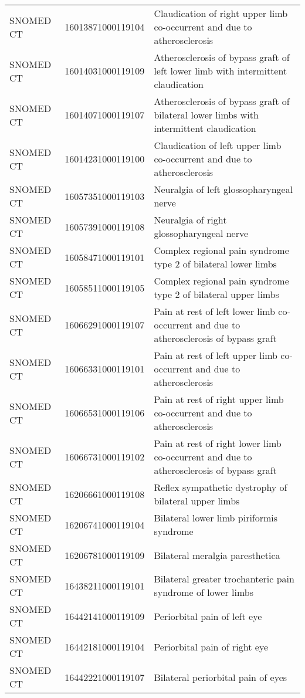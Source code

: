 \begin{longtable}{p{}p{}p{}}
  SNOMED CT & 16013871000119104 & Claudication of right upper limb co-occurrent and due to atherosclerosis \\ 
  SNOMED CT & 16014031000119109 & Atherosclerosis of bypass graft of left lower limb with intermittent claudication \\ 
  SNOMED CT & 16014071000119107 & Atherosclerosis of bypass graft of bilateral lower limbs with intermittent claudication \\ 
  SNOMED CT & 16014231000119100 & Claudication of left upper limb co-occurrent and due to atherosclerosis \\ 
  SNOMED CT & 16057351000119103 & Neuralgia of left glossopharyngeal nerve \\ 
  SNOMED CT & 16057391000119108 & Neuralgia of right glossopharyngeal nerve \\ 
  SNOMED CT & 16058471000119101 & Complex regional pain syndrome type 2 of bilateral lower limbs \\ 
  SNOMED CT & 16058511000119105 & Complex regional pain syndrome type 2 of bilateral upper limbs \\ 
  SNOMED CT & 16066291000119107 & Pain at rest of left lower limb co-occurrent and due to atherosclerosis of bypass graft \\ 
  SNOMED CT & 16066331000119101 & Pain at rest of left upper limb co-occurrent and due to atherosclerosis \\ 
  SNOMED CT & 16066531000119106 & Pain at rest of right upper limb co-occurrent and due to atherosclerosis \\ 
  SNOMED CT & 16066731000119102 & Pain at rest of right lower limb co-occurrent and due to atherosclerosis of bypass graft \\ 
  SNOMED CT & 16206661000119108 & Reflex sympathetic dystrophy of bilateral upper limbs \\ 
  SNOMED CT & 16206741000119104 & Bilateral lower limb piriformis syndrome \\ 
  SNOMED CT & 16206781000119109 & Bilateral meralgia paresthetica \\ 
  SNOMED CT & 16438211000119101 & Bilateral greater trochanteric pain syndrome of lower limbs \\ 
  SNOMED CT & 16442141000119109 & Periorbital pain of left eye \\ 
  SNOMED CT & 16442181000119104 & Periorbital pain of right eye \\ 
  SNOMED CT & 16442221000119107 & Bilateral periorbital pain of eyes \\ 

\end{longtable}
